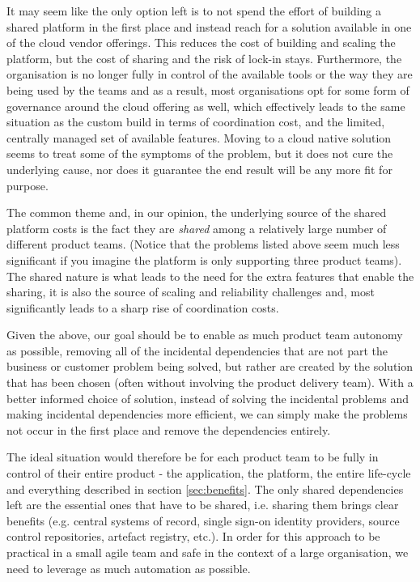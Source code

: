 \documentclass[reprint,amsmath,amssymb,aps]{revtex4-1}
\begin{document}
It may seem like the only option left is to not spend the effort of building a shared platform in the first place and instead reach for a solution available in one of the cloud vendor offerings. This reduces the cost of building and scaling the platform, but the cost of sharing and the risk of lock-in stays. Furthermore, the organisation is no longer fully in control of the available tools or the way they are being used by the teams and as a result, most organisations opt for some form of governance around the cloud offering as well, which effectively leads to the same situation as the custom build in terms of coordination cost, and the limited, centrally managed set of available features. Moving to a cloud native solution seems to treat some of the symptoms of the problem, but it does not cure the underlying cause, nor does it guarantee the end result will be any more fit for purpose.

The common theme and, in our opinion, the underlying source of the shared platform costs is the fact they are \textit{shared} among a relatively large number of different product teams. (Notice that the problems listed above seem much less significant if you imagine the platform is only supporting three product teams). The shared nature is what leads to the need for the extra features that enable the sharing, it is also the source of scaling and reliability challenges and, most significantly leads to a sharp rise of coordination costs.

Given the above, our goal should be to enable as much product team autonomy as possible, removing all of the incidental dependencies that are not part the business or customer problem being solved, but rather are created by the solution that has been chosen (often without involving the product delivery team). With a better informed choice of solution, instead of solving the incidental problems and making incidental dependencies more efficient, we can simply make the problems not occur in the first place and remove the dependencies entirely.

The ideal situation would therefore be for each product team to be fully in control of their entire product - the application, the platform, the entire life-cycle and everything described in section \ref{sec:benefits}. The only shared dependencies left are the essential ones that have to be shared, i.e. sharing them brings clear benefits (e.g. central systems of record, single sign-on identity providers, source control repositories, artefact registry, etc.). In order for this approach to be practical in a small agile team and safe in the context of a large organisation, we need to leverage as much automation as possible.
\end{document}
